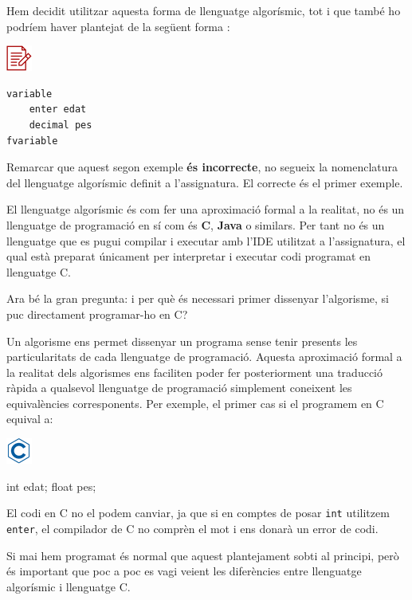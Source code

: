 \documentclass[
]{book}
\newenvironment{Shaded}{\begin{snugshade}}{\end{snugshade}}
\newcommand{\DataTypeTok}[1]{\textcolor[rgb]{0.13,0.29,0.53}{#1}}
\newcommand{\NormalTok}[1]{#1}
\begin{document}
Hem decidit utilitzar aquesta forma de llenguatge algorísmic, tot i que també ho podríem haver plantejat de la següent forma :

\includegraphics{./img/alg_err.png}

\begin{verbatim}
variable
    enter edat
    decimal pes
fvariable
\end{verbatim}

Remarcar que aquest segon exemple \textbf{és incorrecte}, no segueix la nomenclatura del llenguatge algorísmic definit a l'assignatura. El correcte és el primer exemple.

El llenguatge algorísmic és com fer una aproximació formal a la realitat, no és un llenguatge de programació en sí com és \textbf{C}, \textbf{Java} o similars. Per tant no és un llenguatge que es pugui compilar i executar amb l'IDE utilitzat a l'assignatura, el qual està preparat únicament per interpretar i executar codi programat en llenguatge C.

Ara bé la gran pregunta: i per què és necessari primer dissenyar l'algorisme, si puc directament programar-ho en C?

Un algorisme ens permet dissenyar un programa sense tenir presents les particularitats de cada llenguatge de programació. Aquesta aproximació formal a la realitat dels algorismes ens faciliten poder fer posteriorment una traducció ràpida a qualsevol llenguatge de programació simplement coneixent les equivalències corresponents. Per exemple, el primer cas si el programem en C equival a:

\includegraphics{./img/c.png}

\begin{Shaded}
\begin{Highlighting}[]
\DataTypeTok{int}\NormalTok{ edat;}
\DataTypeTok{float}\NormalTok{ pes;}
\end{Highlighting}
\end{Shaded}

El codi en C no el podem canviar, ja que si en comptes de posar \texttt{int} utilitzem \texttt{enter}, el compilador de C no comprèn el mot i ens donarà un error de codi.

Si mai hem programat és normal que aquest plantejament sobti al principi, però és important que poc a poc es vagi veient les diferències entre llenguatge algorísmic i llenguatge C.
\end{document}
